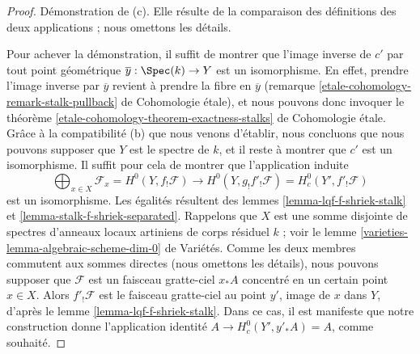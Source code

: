 \begin{proof}
\medskip\noindent
Démonstration de (c). Elle résulte de la comparaison des définitions
des deux applications ; nous omettons les détails.

\medskip\noindent
Pour achever la démonstration, il suffit de montrer que l'image inverse de
$c'$ par tout point géométrique $\overline{y} : \Spec(k) \to Y$
est un isomorphisme. En effet, prendre l'image inverse par $\overline{y}$
revient à prendre la fibre en $\overline{y}$
(remarque \ref{etale-cohomology-remark-stalk-pullback} de Cohomologie étale),
et nous pouvons donc invoquer le
théorème \ref{etale-cohomology-theorem-exactness-stalks} de Cohomologie étale.
Grâce à la compatibilité (b) que nous venons d'établir, nous 
concluons que nous pouvons supposer que $Y$ est le spectre de $k$,
et il reste à montrer que $c'$ est un isomorphisme.
Il suffit pour cela de montrer que l'application induite
$$
\bigoplus\nolimits_{x \in X} \mathcal{F}_x = H^0(Y, f_!\mathcal{F})
\longrightarrow
H^0(Y, g_!f'_!\mathcal{F}) = H^0_c(Y', f'_!\mathcal{F})
$$
est un isomorphisme. Les égalités résultent des
lemmes \ref{lemma-lqf-f-shriek-stalk} et
\ref{lemma-stalk-f-shriek-separated}.
Rappelons que $X$ est une somme disjointe de
spectres d'anneaux locaux artiniens de corps résiduel $k$ ; voir le
lemme \ref{varieties-lemma-algebraic-scheme-dim-0} de Variétés.
Comme les deux membres commutent aux sommes directes
(nous omettons les détails), nous pouvons supposer que $\mathcal{F}$ est un faisceau gratte-ciel
$x_*A$ concentré en un certain point $x \in X$.
Alors $f'_!\mathcal{F}$ est le faisceau gratte-ciel au point
$y'$, image de $x$ dans $Y$, d'après le lemme \ref{lemma-lqf-f-shriek-stalk}.
Dans ce cas, il est manifeste que notre construction
donne l'application identité $A \to H^0_c(Y', y'_*A) = A$,
comme souhaité.
\end{proof}

